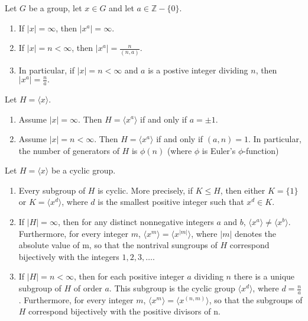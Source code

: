\documentclass[../main]{subfiles}
\begin{document}
 
 \begin{prop}
  Let $G$ be a group, let $x\in G$ and let $a\in \mathbb{Z}-\{0\}.$
  \begin{enumerate}
   \item If $|x| = \infty$, then $|x^a| = \infty$.
   \item If $|x| = n < \infty$, then $|x^a|=\frac{n}{(n,a)}$.
   \item In particular, if $|x|=n<\infty$ and $a$ is a postive integer dividing $n$, then $|x^a|=\frac{n}{a}.$
  \end{enumerate}
 \end{prop}

 
 \begin{prop}
  Let $H=\langle x\rangle$.
  \begin{enumerate}
   \item Assume $|x|= \infty$. Then $H=\langle x^a \rangle$ if and only if $a=\pm 1$.
   \item Assume $|x| = n <\infty$. Then $H=\langle x^a \rangle$ if and only if $(a,n)=1$. In particular, the number of generators of $H$ is $\phi (n)$ (where $\phi$ is Euler's $\phi$-function)
  \end{enumerate}
 \end{prop}

 
 
 \begin{thm}
  Let $H=\langle x \rangle$ be a cyclic group. 
  \begin{enumerate}
   \item Every subgroup of $H$ is cyclic. More precisely, if $K\leq H$, then either $K=\{1\}$ or $K=\langle x^d \rangle$, where $d$ is the smallest positive integer such that $x^d \in K$.
   \item If $|H| = \infty$, then for any distinct nonnegative integers $a$ and $b$, $\langle x^a \rangle \neq \langle x^b \rangle$. Furthermore, for every integer $m$, $\langle x^m \rangle = \langle x^{|m|} \rangle$, where $|m|$ denotes the absolute value of m, so that the nontrival sungroups of $H$ correspond bijectively with the integers $1,2,3,\ldots$.
   \item If $|H| = n <\infty$, then for each positive integer $a$ dividing $n$ there is a unique subgroup of $H$ of order $a$. This subgroup is the cyclic group $\langle x^d \rangle$, where $d=\frac{n}{a}$. Furthermore, for every integer $m$, $\langle x^m \rangle = \langle x^{(n,m)} \rangle$, so that the subgroups of $H$ correspond bijectively with the positive divisors of n.
  \end{enumerate}
 \end{thm}
\end{document}
